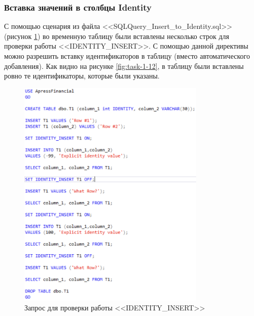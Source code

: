 \documentclass[a4paper, 14pt]{extarticle}
\begin{document}
\subsubsection{Вставка значений в столбцы Identity}

С помощью сценария из файла
<<\foreignlanguage{english}{SQLQuery\_Insert\_to\_Identity.sql}>> (рисунок
\ref{fig:task-1-11}) во временную таблицу были вставлены несколько строк для
проверки работы <<\foreignlanguage{english}{IDENTITY\_INSERT}>>. С помощью
данной директивы можно разрешить вставку идентификаторов в таблицу (вместо
автоматического добавления). Как видно на рисунке \ref{fig:task-1-12},
в таблицу были вставлены ровно те идентификаторы, которые были указаны.

\begin{figure}[H]
  \centering
  \includegraphics[width=0.8\textwidth]{images/task-1/11.png}
  \caption{
    Запрос для проверки работы <<\foreignlanguage{english}{IDENTITY\_INSERT}>>
  }
  \label{fig:task-1-11}
\end{figure}
\end{document}
